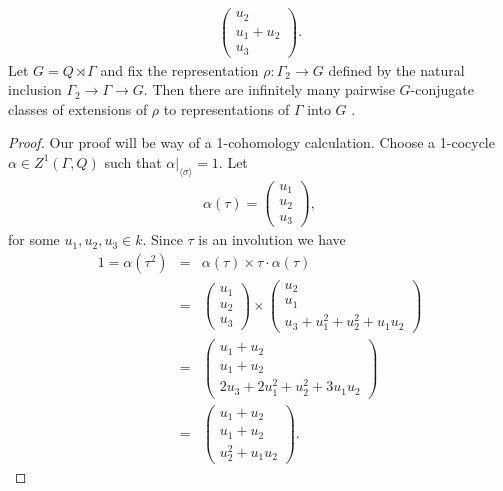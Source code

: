 \begin{example}
\begin{eqnarray*}
	\left(\begin{matrix} u_2 \\ u_1 + u_2 \\ u_3 \end{matrix} \right).
\end{eqnarray*}
Let $G = Q \rtimes \Gamma$ and fix the representation $\rho:\Gamma_2 \rightarrow G$ defined by the natural inclusion $\Gamma_2 \rightarrow \Gamma \rightarrow G$. Then there are infinitely many pairwise $G$-conjugate classes of extensions of $\rho$ to representations of $\Gamma$ into $G$ \cite[Appendix]{slodowy1997two}.
\label{eg:non_red}
\end{example}
\begin{proof}
	Our proof will be way of a 1-cohomology calculation. Choose a 1-cocycle $\alpha \in Z^1(\Gamma, Q)$ such that $\alpha|_{\langle \sigma \rangle} = 1$. Let
	\begin{eqnarray*}
		\alpha(\tau) = \left(\begin{matrix} u_1 \\ u_2 \\ u_3 \end{matrix} \right),
	\end{eqnarray*}
	for some $u_1, u_2, u_3 \in k$. Since $\tau$ is an involution we have
	\begin{eqnarray*}
		1 = \alpha(\tau^2) &=& \alpha(\tau) \times \tau\cdot\alpha(\tau)\\
		&=& \left(\begin{matrix} u_1 \\ u_2 \\ u_3\end{matrix} \right) \times 
		\left(\begin{matrix} u_2 \\ u_1 \\ u_3 + u_1^2 + u_2^2 + u_1u_2\end{matrix} \right) \\
		&=& \left(\begin{matrix} u_1 + u_2 \\ u_1 + u_2 \\ 2u_3 + 2u_1^2 + u_2^2 + 3u_1u_2\end{matrix} \right)\\
		&=& \left(\begin{matrix} u_1 + u_2 \\ u_1 + u_2 \\ u_2^2 + u_1u_2\end{matrix} \right).
	\end{eqnarray*}

\end{proof}
